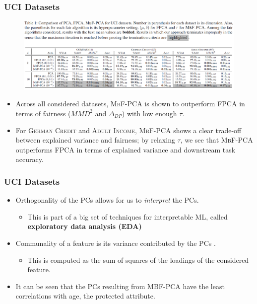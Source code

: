 \documentclass{beamer}
\begin{document}
\begin{frame}
	\frametitle{UCI Datasets}
	\begin{figure}
		\centering
		\includegraphics[width=\linewidth]{table.png}
	\end{figure}

	\begin{itemize}
		\item Across all considered datasets, \textsc{MbF-PCA} is shown to outperform \textsc{FPCA} in terms of fairness ($MMD^2$ and $\Delta_{DP}$) with low enough $\tau$.
		
		\item For \textsc{German Credit} and \textsc{Adult Income}, \textsc{MbF-PCA} shows a clear trade-off between explained variance and fairness; by relaxing $\tau$, we see that \textsc{MbF-PCA} outperforms \textsc{FPCA} in terms of explained variance and downstream task accuracy.
	\end{itemize}
\end{frame}


\begin{frame}
	\frametitle{UCI Datasets}
	\begin{itemize}
		\item Orthogonality of the PCs allows for us to {\it interpret} the PCs.
		\begin{itemize}
			\item This is part of a big set of techniques for interpretable ML, called {\bf exploratory data analysis (EDA)}
		\end{itemize}
		
		\item Communality of a feature is its variance contributed by the PCs \cite{multivariate-analysis}.
		\begin{itemize}
			\item This is computed as the sum of squares of the loadings of the considered feature.
		\end{itemize}
	
		\item It can be seen that the PCs resulting from
		MBF-PCA have the least correlations with age, the protected
		attribute.
	\end{itemize}
\end{frame}
\end{document}
